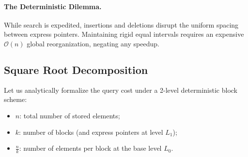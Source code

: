\paragraph{The Deterministic Dilemma.}
While search is expedited, insertions and deletions disrupt the uniform spacing between express pointers. Maintaining rigid equal intervals requires an expensive $\mathcal{O}(n)$ global reorganization, negating any speedup.

\subsection{Square Root Decomposition}
Let us analytically formalize the query cost under a 2-level deterministic block scheme:
\begin{itemize}
  \item $n$: total number of stored elements;
  \item $k$: number of blocks (and express pointers at level $L_1$);
  \item $\frac{n}{k}$: number of elements per block at the base level $L_0$.
\end{itemize}

